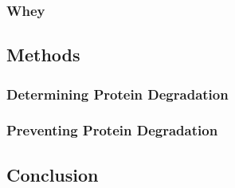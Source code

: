 \subsubsection{Whey}


\subsection{Methods}

\subsubsection{Determining Protein Degradation}

\subsubsection{Preventing Protein Degradation}





\subsection{Conclusion}

